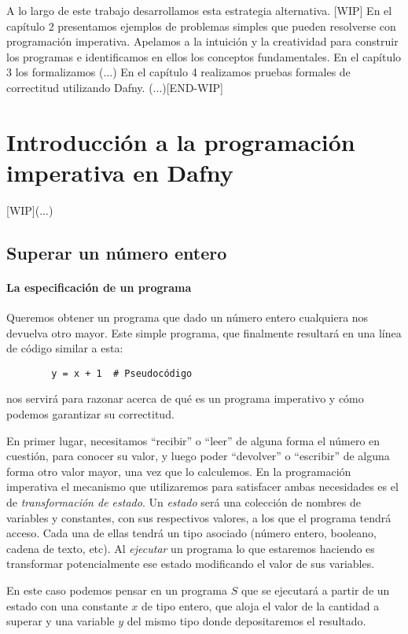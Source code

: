 \documentclass[12pt, a4paper, openany, fleqn]{book}
\begin{document}
    A lo largo de este trabajo desarrollamos esta estrategia alternativa.
    [WIP]
    En el capítulo 2 presentamos ejemplos de problemas simples que pueden resolverse con programación imperativa. Apelamos a la intuición y la creatividad para construir los programas e identificamos en ellos los conceptos fundamentales.
    En el capítulo 3 los formalizamos (...)
    En el capítulo 4 realizamos pruebas formales de correctitud utilizando Dafny. (...)[END-WIP]

    \chapter{Introducción a la programación imperativa en Dafny}
    [WIP](...)

    \section{Superar un número entero}
    \subsubsection*{La especificación de un programa}

    Queremos obtener un programa que dado un número entero cualquiera nos devuelva otro mayor. Este simple programa, que finalmente resultará en una línea de código similar a esta:
    \begin{verbatim}
        y = x + 1  # Pseudocódigo
    \end{verbatim}
    nos servirá para razonar acerca de qué es un programa imperativo y cómo podemos garantizar su correctitud.

    En primer lugar, necesitamos ``recibir'' o ``leer'' de alguna forma el número en cuestión, para conocer su valor, y luego poder ``devolver'' o ``escribir'' de alguna forma otro valor mayor, una vez que lo calculemos.
    En la programación imperativa el mecanismo que utilizaremos para satisfacer ambas necesidades es el de \textit{transformación de estado}.
    Un \textit{estado} será una colección de nombres de variables y constantes, con sus respectivos valores, a los que el programa tendrá acceso. Cada una de ellas tendrá un tipo asociado (número entero, booleano, cadena de texto, etc). Al \textit{ejecutar} un programa lo que estaremos haciendo es transformar potencialmente ese estado modificando el valor de sus variables.

    En este caso podemos pensar en un programa $S$ que se ejecutará a partir de un estado con una constante $x$ de tipo entero, que aloja el valor de la cantidad a superar y una variable $y$ del mismo tipo donde depositaremos el resultado.
\end{document}

